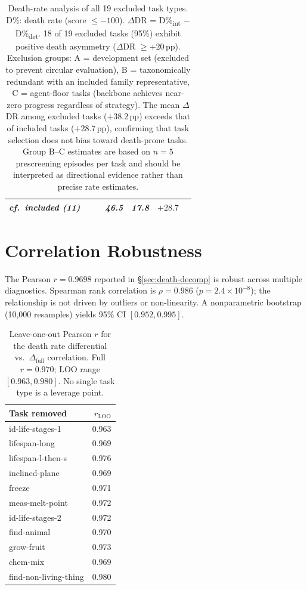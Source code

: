 \documentclass[11pt]{article}
\begin{document}
\begin{table}[t]
{\begin{tabular}{@{}llrcccl@{}}
\textit{cf.\ included (11)}   &   &    & \textit{46.5} & \textit{17.8} & $\textit{+28.7}$ & \\
\bottomrule
\end{tabular}}%
\caption{Death-rate analysis of all 19 excluded task types. D\%: death rate (score $\leq -100$). $\Delta$DR = D\%\textsubscript{int} $-$ D\%\textsubscript{det}. 18 of 19 excluded tasks (95\%) exhibit positive death asymmetry ($\Delta$DR $\geq +20$\,pp). Exclusion groups: A = development set (excluded to prevent circular evaluation), B = taxonomically redundant with an included family representative, C = agent-floor tasks (backbone achieves near-zero progress regardless of strategy). The mean $\Delta$DR among excluded tasks ($+38.2$\,pp) exceeds that of included tasks ($+28.7$\,pp), confirming that task selection does not bias toward death-prone tasks. Group B--C estimates are based on $n{=}5$ prescreening episodes per task and should be interpreted as directional evidence rather than precise rate estimates.}
\label{tab:excluded-death}
\end{table}

\section{Correlation Robustness}
\label{app:correlation}

The Pearson $r = 0.9698$ reported in \S\ref{sec:death-decomp} is robust across multiple diagnostics. Spearman rank correlation is $\rho = 0.986$ ($p = 2.4 \times 10^{-8}$); the relationship is not driven by outliers or non-linearity. A nonparametric bootstrap (10{,}000 resamples) yields 95\% CI $[0.952, 0.995]$.

\begin{table}[h]
\centering
\small
\begin{tabular}{@{}lr@{}}
\toprule
Task removed & $r_{\text{LOO}}$ \\
\midrule
id-life-stages-1       & 0.963 \\
lifespan-long          & 0.969 \\
lifespan-l-then-s      & 0.976 \\
inclined-plane         & 0.969 \\
freeze                 & 0.971 \\
meas-melt-point        & 0.972 \\
id-life-stages-2       & 0.972 \\
find-animal            & 0.970 \\
grow-fruit             & 0.973 \\
chem-mix               & 0.969 \\
find-non-living-thing  & 0.980 \\
\bottomrule
\end{tabular}
\caption{Leave-one-out Pearson $r$ for the death rate differential vs.\ $\Delta_{\text{full}}$ correlation. Full $r = 0.970$; LOO range $[0.963, 0.980]$. No single task type is a leverage point.}
\label{tab:loo}
\end{table}
\end{document}
